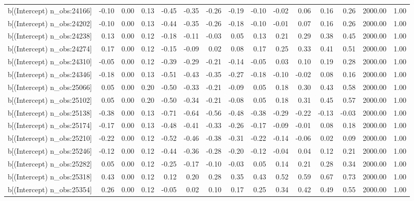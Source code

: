 \begin{table}[ht]
\begin{tabular}{rrrrrrrrrrrrrrr}
  b[(Intercept) n\_obs:24166] & -0.10 & 0.00 & 0.13 & -0.45 & -0.35 & -0.26 & -0.19 & -0.10 & -0.02 & 0.06 & 0.16 & 0.26 & 2000.00 & 1.00 \\ 
  b[(Intercept) n\_obs:24202] & -0.10 & 0.00 & 0.13 & -0.44 & -0.35 & -0.26 & -0.18 & -0.10 & -0.01 & 0.07 & 0.16 & 0.26 & 2000.00 & 1.00 \\ 
  b[(Intercept) n\_obs:24238] & 0.13 & 0.00 & 0.12 & -0.18 & -0.11 & -0.03 & 0.05 & 0.13 & 0.21 & 0.29 & 0.38 & 0.45 & 2000.00 & 1.00 \\ 
  b[(Intercept) n\_obs:24274] & 0.17 & 0.00 & 0.12 & -0.15 & -0.09 & 0.02 & 0.08 & 0.17 & 0.25 & 0.33 & 0.41 & 0.51 & 2000.00 & 1.00 \\ 
  b[(Intercept) n\_obs:24310] & -0.05 & 0.00 & 0.12 & -0.39 & -0.29 & -0.21 & -0.14 & -0.05 & 0.03 & 0.10 & 0.19 & 0.28 & 2000.00 & 1.00 \\ 
  b[(Intercept) n\_obs:24346] & -0.18 & 0.00 & 0.13 & -0.51 & -0.43 & -0.35 & -0.27 & -0.18 & -0.10 & -0.02 & 0.08 & 0.16 & 2000.00 & 1.00 \\ 
  b[(Intercept) n\_obs:25066] & 0.05 & 0.00 & 0.20 & -0.50 & -0.33 & -0.21 & -0.09 & 0.05 & 0.18 & 0.30 & 0.43 & 0.58 & 2000.00 & 1.00 \\ 
  b[(Intercept) n\_obs:25102] & 0.05 & 0.00 & 0.20 & -0.50 & -0.34 & -0.21 & -0.08 & 0.05 & 0.18 & 0.31 & 0.45 & 0.57 & 2000.00 & 1.00 \\ 
  b[(Intercept) n\_obs:25138] & -0.38 & 0.00 & 0.13 & -0.71 & -0.64 & -0.56 & -0.48 & -0.38 & -0.29 & -0.22 & -0.13 & -0.03 & 2000.00 & 1.00 \\ 
  b[(Intercept) n\_obs:25174] & -0.17 & 0.00 & 0.13 & -0.48 & -0.41 & -0.33 & -0.26 & -0.17 & -0.09 & -0.01 & 0.08 & 0.18 & 2000.00 & 1.00 \\ 
  b[(Intercept) n\_obs:25210] & -0.22 & 0.00 & 0.12 & -0.52 & -0.46 & -0.38 & -0.31 & -0.22 & -0.14 & -0.06 & 0.02 & 0.09 & 2000.00 & 1.00 \\ 
  b[(Intercept) n\_obs:25246] & -0.12 & 0.00 & 0.12 & -0.44 & -0.36 & -0.28 & -0.20 & -0.12 & -0.04 & 0.04 & 0.12 & 0.21 & 2000.00 & 1.00 \\ 
  b[(Intercept) n\_obs:25282] & 0.05 & 0.00 & 0.12 & -0.25 & -0.17 & -0.10 & -0.03 & 0.05 & 0.14 & 0.21 & 0.28 & 0.34 & 2000.00 & 1.00 \\ 
  b[(Intercept) n\_obs:25318] & 0.43 & 0.00 & 0.12 & 0.12 & 0.20 & 0.28 & 0.35 & 0.43 & 0.52 & 0.59 & 0.67 & 0.73 & 2000.00 & 1.00 \\ 
  b[(Intercept) n\_obs:25354] & 0.26 & 0.00 & 0.12 & -0.05 & 0.02 & 0.10 & 0.17 & 0.25 & 0.34 & 0.42 & 0.49 & 0.55 & 2000.00 & 1.00 \\ 

\end{tabular}
\end{table}
